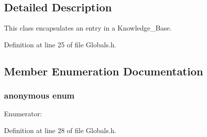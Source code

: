 \subsection{Detailed Description}
This class encapsulates an entry in a Knowledge\_\-Base. 

Definition at line 25 of file Globals.h.



\subsection{Member Enumeration Documentation}
\hypertarget{classMadara_1_1Knowledge__Record_ad2b1ec153b2e1021cbd81eda234e02ea}{
\subsubsection[{"@2}]{\setlength{\rightskip}{0pt plus 5cm}anonymous enum}}
\label{d9/dcb/classMadara_1_1Knowledge__Record_ad2b1ec153b2e1021cbd81eda234e02ea}
\begin{Desc}
\item[Enumerator: ]\par
\begin{description}
\item[{\em 
\hypertarget{classMadara_1_1Knowledge__Record_ad2b1ec153b2e1021cbd81eda234e02eaa85bb60bc156d325ad1a77de109bde780}{
UNMODIFIED}
\label{d9/dcb/classMadara_1_1Knowledge__Record_ad2b1ec153b2e1021cbd81eda234e02eaa85bb60bc156d325ad1a77de109bde780}
}]\item[{\em 
\hypertarget{classMadara_1_1Knowledge__Record_ad2b1ec153b2e1021cbd81eda234e02eaae3fecd51f9f872e7c6a4da00e8445ec6}{
MODIFIED}
\label{d9/dcb/classMadara_1_1Knowledge__Record_ad2b1ec153b2e1021cbd81eda234e02eaae3fecd51f9f872e7c6a4da00e8445ec6}
}]\end{description}
\end{Desc}



Definition at line 28 of file Globals.h.


